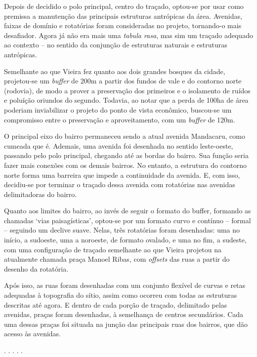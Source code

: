 \documentclass[12pt, a4paper]{book} %
\begin{document}
        Depois de decidido o polo principal, centro do traçado, optou-se por usar como premissa a manutenção das principais estruturas antrópicas da área. Avenidas, faixas de domínio e rotatórias foram consideradas no projeto, tornando-o mais desafiador. Agora já não era mais uma \textit{tabula rasa}, mas sim um traçado adequado ao contexto – no sentido da conjunção de estruturas naturais e estruturas antrópicas.

        Semelhante ao que Vieira fez quanto aos dois grandes bosques da cidade, projetou-se um \textit{buffer} de 200m a partir dos fundos de vale e do contorno norte (rodovia), de modo a prover a preservação dos primeiros e o isolamento de ruídos e poluíção oriundos do segundo. Todavia, ao notar que a perda de 100ha de área poderiam inviabilizar o projeto do ponto de vista econômico, buscou-se um compromisso entre o preservação e aproveitamento, com um \textit{buffer} de 120m. 
        
        O principal eixo do bairro permaneceu sendo a atual avenida Mandacaru, como cumeada que é. Ademais, uma avenida foi desenhada no sentido leste-oeste, passando pelo polo principal, chegando até as bordas do bairro. Sua função seria fazer mais conexões com os demais bairros. No entanto, a estrutura do contorno norte forma uma barreira que impede a continuidade da avenida. E, com isso, decidiu-se por terminar o traçado dessa avenida com rotatórias nas avenidas delimitadoras do bairro.

        Quanto aos limites do bairro, ao invés de seguir o formato do buffer, formando as chamadas `vias paisagísticas', optou-se por um formato curvo e contínuo – formal – seguindo um declive suave. Nelas, três rotatórias foram desenhadas: uma no início, a sudoeste, uma a noroeste, de formato ovalado, e uma no fim, a sudeste, com uma configuração de traçado semelhante ao que Vieira projetou na atualmente chamada praça Manoel Ribas, com \textit{offsets} das ruas a partir do desenho da rotatória.

        Após isso, as ruas foram desenhadas com um conjunto flexível de curvas e retas adequadas à topografia do sítio, assim como ocorreu com todas as estruturas descritas até agora. E dentro de cada porção de traçado, delimitado pelas avenidas, praças foram desenhadas, à semelhança de centros secundários. Cada uma dessas praças foi situada na junção das principais ruas dos bairros, que dão acesso às avenidas.

        \begin{center}
            . . . . .
        \end{center} 
\end{document}
